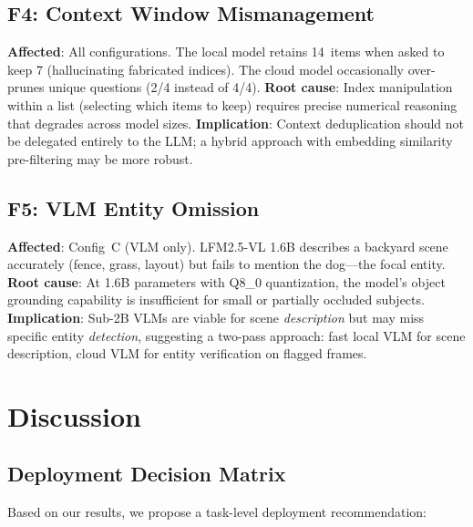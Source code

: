 \documentclass[conference]{IEEEtran}
\begin{document}
\subsection{F4: Context Window Mismanagement}
\textbf{Affected}: All configurations. The local model retains 14~items
when asked to keep 7 (hallucinating fabricated indices). The cloud model
occasionally over-prunes unique questions (2/4 instead of 4/4).
\textbf{Root cause}: Index manipulation within a list (selecting which
items to keep) requires precise numerical reasoning that degrades across
model sizes.
\textbf{Implication}: Context deduplication should not be delegated
entirely to the LLM; a hybrid approach with embedding similarity
pre-filtering may be more robust.

\subsection{F5: VLM Entity Omission}
\textbf{Affected}: Config~C (VLM only). LFM2.5-VL 1.6B describes a
backyard scene accurately (fence, grass, layout) but fails to mention
the dog---the focal entity.
\textbf{Root cause}: At 1.6B parameters with Q8\_0 quantization, the
model's object grounding capability is insufficient for small or
partially occluded subjects.
\textbf{Implication}: Sub-2B VLMs are viable for scene \emph{description}
but may miss specific entity \emph{detection}, suggesting a two-pass
approach: fast local VLM for scene description, cloud VLM for entity
verification on flagged frames.


\section{Discussion}

\subsection{Deployment Decision Matrix}

Based on our results, we propose a task-level deployment recommendation:
\end{document}
